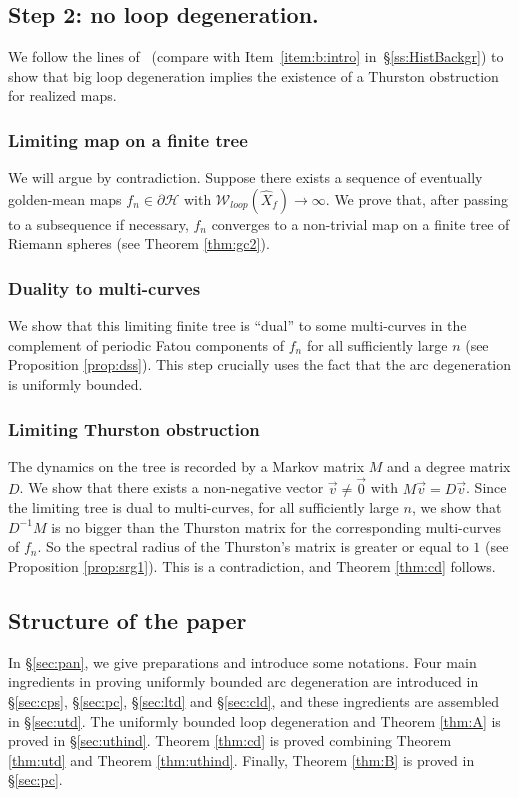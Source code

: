\documentclass[11pt, reqno]{amsart}
\numberwithin{equation}{section}
\theoremstyle{plain}
\theoremstyle{theorem}
\theoremstyle{plain}
\theoremstyle{definition}
\numberwithin{figure}{section}
\begin{document}
\subsection*{Step 2: no loop degeneration.} We follow the lines of~\cite{Luo21b} (compare with Item~\ref{item:b:intro} in~\S\ref{ss:HistBackgr}) to show that big loop degeneration implies the existence of a Thurston obstruction for realized maps.



\subsubsection{Limiting map on a finite tree}
We will argue by contradiction. Suppose there exists a sequence of eventually golden-mean maps $f_n \in \partial \mathcal{H}$ with $\mathcal{W}_{loop}(\widehat X_f) \to \infty$.
We prove that, after passing to a subsequence if necessary, $f_n$ converges to a non-trivial map on a finite tree of Riemann spheres (see Theorem \ref{thm:gc2}).

\subsubsection{Duality to multi-curves}
We show that this limiting finite tree is ``dual'' to some multi-curves in the complement of periodic Fatou components of $f_n$ for all sufficiently large $n$ (see Proposition \ref{prop:dss}).
This step crucially uses the fact that the arc degeneration is uniformly bounded.

\subsubsection{Limiting Thurston obstruction}
The dynamics on the tree is recorded by a Markov matrix $M$ and a degree matrix $D$.
We show that there exists a non-negative vector $\vec{v} \neq \vec{0}$ with $M\vec v = D \vec v$.
Since the limiting tree is dual to multi-curves, for all sufficiently large $n$, we show that $D^{-1}M$ is no bigger than the Thurston matrix for the corresponding multi-curves of $f_n$.
So the spectral radius of the Thurston's matrix is greater or equal to $1$ (see Proposition \ref{prop:srg1}).
This is a contradiction, and Theorem \ref{thm:cd} follows.



\subsection*{Structure of the paper}
In \S \ref{sec:pan}, we give preparations and introduce some notations.
Four main ingredients in proving uniformly bounded arc degeneration are introduced in \S \ref{sec:cps}, \S \ref{sec:pc}, \S \ref{sec:ltd} and \S \ref{sec:cld}, and these ingredients are assembled in \S \ref{sec:utd}.
The uniformly bounded loop degeneration and Theorem \ref{thm:A} is proved in \S \ref{sec:uthind}.
Theorem \ref{thm:cd} is proved combining Theorem \ref{thm:utd} and Theorem \ref{thm:uthind}.
Finally, Theorem \ref{thm:B} is proved in \S \ref{sec:pc}.
\end{document}
